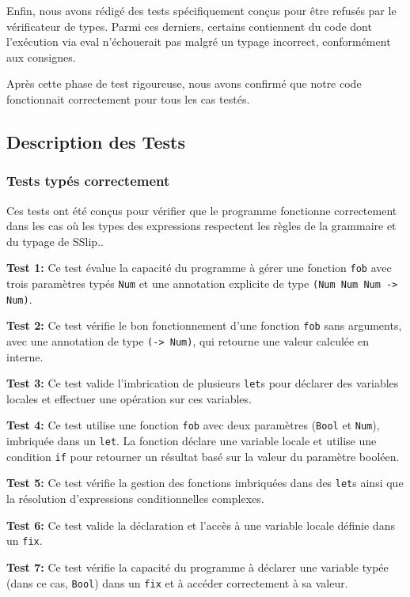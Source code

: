 \documentclass{article}
\begin{document}
Enfin, nous avons rédigé des tests spécifiquement conçus pour être refusés par le vérificateur de types. Parmi ces derniers, certains contiennent du code dont l’exécution via eval n’échouerait pas malgré un typage incorrect, conformément aux consignes.

Après cette phase de test rigoureuse, nous avons confirmé que notre code fonctionnait correctement pour tous les cas testés.

 \subsection{Description des Tests}
 \subsubsection{Tests typés correctement}
 Ces tests ont été conçus pour vérifier que le programme fonctionne correctement dans les cas où les types des expressions respectent les règles de la grammaire et du typage de SSlip..

\textbf{Test 1:}  
   Ce test évalue la capacité du programme à gérer une fonction \texttt{fob} avec trois paramètres typés \texttt{Num} et une annotation explicite de type \texttt{(Num Num Num -> Num)}.

\textbf{Test 2:} 
   Ce test vérifie le bon fonctionnement d'une fonction \texttt{fob} sans arguments, avec une annotation de type \texttt{(-> Num)}, qui retourne une valeur calculée en interne.

\textbf{Test 3:}  
   Ce test valide l'imbrication de plusieurs \texttt{let}s pour déclarer des variables locales et effectuer une opération sur ces variables.

\textbf{Test 4:}  
   Ce test utilise une fonction \texttt{fob} avec deux paramètres (\texttt{Bool} et \texttt{Num}), imbriquée dans un \texttt{let}. La fonction déclare une variable locale et utilise une condition \texttt{if} pour retourner un résultat basé sur la valeur du paramètre booléen.

\textbf{Test 5:}  
   Ce test vérifie la gestion des fonctions imbriquées dans des \texttt{let}s ainsi que la résolution d'expressions conditionnelles complexes. 

\textbf{Test 6:}
    Ce test valide la déclaration et l'accès à une variable locale définie dans un \texttt{fix}.

\textbf{Test 7:}   
   Ce test vérifie la capacité du programme à déclarer une variable typée (dans ce cas, \texttt{Bool}) dans un \texttt{fix} et à accéder correctement à sa valeur.
   
\end{document}
